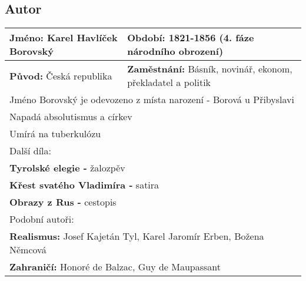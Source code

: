 \subsection*{Autor}
\begin{tabularx}{\linewidth}{l|l}
    \textbf{Jméno:} Karel Havlíček Borovský & \textbf{Období:} 1821-1856 (4. fáze národního obrození)             \\
    \hline
    \textbf{Původ:} Česká republika         & \textbf{Zaměstnání:} Básník, novinář, ekonom, překladatel a politik \\
    \hline
    \multicolumn{2}{l}{Jméno Borovský je odevozeno z místa narození - Borová u Přibyslavi}                        \\
    \multicolumn{2}{l}{Napadá absolutismus a církev}                                                              \\
    \multicolumn{2}{l}{Umírá na tuberkulózu}                                                                      \\
    \hline
    \multicolumn{2}{l}{Další díla:}                                                                               \\
    \multicolumn{2}{l}{\textbf{Tyrolské elegie -} žalozpěv}                                                       \\
    \multicolumn{2}{l}{\textbf{Křest svatého Vladimíra -} satira}                                                 \\
    \multicolumn{2}{l}{\textbf{Obrazy z Rus -} cestopis}                                                          \\
    \hline
    \multicolumn{2}{l}{Podobní autoři:}                                                                           \\
    \multicolumn{2}{l}{\textbf{Realismus:} Josef Kajetán Tyl, Karel Jaromír Erben, Božena Němcová}                \\
    \multicolumn{2}{l}{\textbf{Zahraničí:} Honoré de Balzac, Guy de Maupassant}                                   \\
\end{tabularx}
